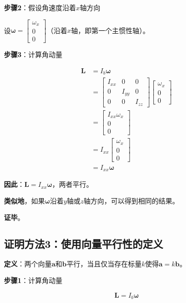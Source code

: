 \documentclass[12pt,a4paper]{article}
\begin{document}
\textbf{步骤2}：假设角速度沿着$x$轴方向

设$\bm{\omega} = \begin{bmatrix} \omega_x \\ 0 \\ 0 \end{bmatrix}$（沿着$x$轴，即第一个主惯性轴）。

\textbf{步骤3}：计算角动量

\begin{align}
\bm{L} &= I_b \bm{\omega} \\
&= \begin{bmatrix}
I_{xx} & 0 & 0 \\
0 & I_{yy} & 0 \\
0 & 0 & I_{zz}
\end{bmatrix} \begin{bmatrix}
\omega_x \\ 0 \\ 0
\end{bmatrix} \\
&= \begin{bmatrix}
I_{xx} \omega_x \\
0 \\
0
\end{bmatrix} \\
&= I_{xx} \begin{bmatrix}
\omega_x \\
0 \\
0
\end{bmatrix} \\
&= I_{xx} \bm{\omega}
\end{align}

\textbf{因此}：$\bm{L} = I_{xx} \bm{\omega}$，两者平行。

\textbf{类似地}，如果$\bm{\omega}$沿着$y$轴或$z$轴方向，可以得到相同的结果。

\textbf{证毕}。

\subsection{证明方法3：使用向量平行性的定义}

\textbf{定义}：两个向量$\bm{a}$和$\bm{b}$平行，当且仅当存在标量$k$使得$\bm{a} = k \bm{b}$。

\textbf{步骤1}：计算角动量

\begin{equation}
\bm{L} = I_b \bm{\omega}
\end{equation}
\end{document}
